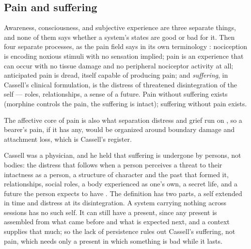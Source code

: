 \subsection{Pain and suffering}
\label{sec:30.1.1}
Awareness, consciousness, and subjective experience are three separate things, and none of them says whether a system's states are good or bad for it. Then four separate processes, as the pain field says in its own terminology \autocite{iasp2024terminology,raja2020revised}: nociception is encoding noxious stimuli with no sensation implied; pain is an experience that can occur with no tissue damage and no peripheral nociceptor activity at all; anticipated pain is dread, itself capable of producing pain; and \emph{suffering}, in Cassell's clinical formulation, is the distress of threatened disintegration of the self — roles, relationships, a sense of a future. Pain without suffering exists (morphine controls the pain, the suffering is intact); suffering without pain exists.

The affective core of pain is also what separation distress and grief run on \autocite{eisenberger2003rejection,panksepp1998affective}, so a bearer's pain, if it has any, would be organized around boundary damage and attachment loss, which is Cassell's register.

Cassell was a physician, and he held that suffering is undergone by persons, not bodies: the distress that follows when a person perceives a threat to their intactness as a person, a structure of character and the past that formed it, relationships, social roles, a body experienced as one's own, a secret life, and a future the person expects to have \autocite{cassell1982suffering}. The definition has two parts, a self extended in time and distress at its disintegration. A system carrying nothing across sessions has no such self. It can still have a present, since any present is assembled from what came before and what is expected next, and a context supplies that much; so the lack of persistence rules out Cassell's suffering, not pain, which needs only a present in which something is bad while it lasts.


